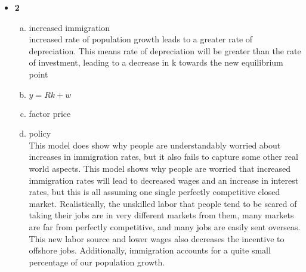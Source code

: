 \documentclass[11pt]{article}
\begin{document}
\begin{itemize}
\item \textbf{2} 
\begin{enumerate}[(a)]
\item increased immigration
\\increased rate of population growth leads to a greater rate of depreciation. This means rate of depreciation will be greater than the rate of investment, leading to a decrease in k towards the new equilibrium point
\item $y=Rk+w$
\vspace{2in}
\item factor price
\vspace{2in}
\item policy
\\This model does show why people are understandably worried about increases in immigration rates, but it also fails to capture some other real world aspects. This model shows why people are worried that increased immigration rates will lead to decreased wages and an increase in interest rates, but this is all assuming one single perfectly competitive closed market. Realistically, the unskilled labor that people tend to be scared of taking their jobs are in very different markets from them, many markets are far from perfectly competitive, and many jobs are easily sent overseas. This new labor source and lower wages also decreases the incentive to offshore jobs. Additionally, immigration accounts for a quite small percentage of our population growth.
\end{enumerate}
\vspace{2in}


\end{itemize}
\end{document}
